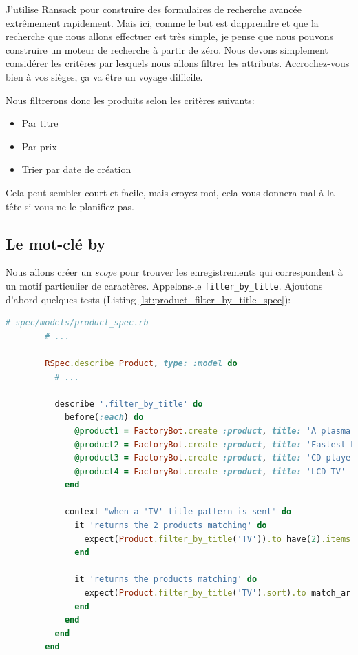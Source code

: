 \documentclass[]{report}
\begin{document}
    J'utilise \href{https://github.com/activerecord-hackery/ransack}{Ransack} pour construire des formulaires de recherche avancée extrêmement rapidement. Mais ici, comme le but est dapprendre et que la recherche que nous allons effectuer est très simple, je pense que nous pouvons construire un moteur de recherche à partir de zéro. Nous devons simplement considérer les critères par lesquels nous allons filtrer les attributs. Accrochez-vous bien à vos sièges, ça va être un voyage difficile.

    Nous filtrerons donc les produits selon les critères suivants:

    \begin{itemize}
      \item Par titre
      \item Par prix
      \item Trier par date de création
    \end{itemize}

    Cela peut sembler court et facile, mais croyez-moi, cela vous donnera mal à la tête si vous ne le planifiez pas.

    \subsection{Le mot-clé by}

      Nous allons créer un \textit{scope} pour trouver les enregistrements qui correspondent à un motif particulier de caractères. Appelons-le \verb|filter_by_title|. Ajoutons d'abord quelques tests (Listing \ref{lst:product_filter_by_title_spec}):

      \begin{scriptsize}
        \begin{lstlisting}[language=ruby, caption={Test du filtrage des produits par titre}, label={lst:product_filter_by_title_spec}]
        # spec/models/product_spec.rb
        # ...

        RSpec.describe Product, type: :model do
          # ...

          describe '.filter_by_title' do
            before(:each) do
              @product1 = FactoryBot.create :product, title: 'A plasma TV'
              @product2 = FactoryBot.create :product, title: 'Fastest Laptop'
              @product3 = FactoryBot.create :product, title: 'CD player'
              @product4 = FactoryBot.create :product, title: 'LCD TV'
            end

            context "when a 'TV' title pattern is sent" do
              it 'returns the 2 products matching' do
                expect(Product.filter_by_title('TV')).to have(2).items
              end

              it 'returns the products matching' do
                expect(Product.filter_by_title('TV').sort).to match_array([@product1, @product4])
              end
            end
          end
        end
        \end{lstlisting}
      \end{scriptsize}
\end{document}

